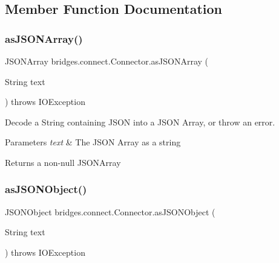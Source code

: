 \subsection{Member Function Documentation}
\mbox{\label{classbridges_1_1connect_1_1_connector_aa5bd647713545fa24c6d730eacb6bc54}} 
\subsubsection{\texorpdfstring{as\+J\+S\+O\+N\+Array()}{asJSONArray()}}
{\footnotesize\ttfamily J\+S\+O\+N\+Array bridges.\+connect.\+Connector.\+as\+J\+S\+O\+N\+Array (\begin{DoxyParamCaption}\item[{String}]{text }\end{DoxyParamCaption}) throws I\+O\+Exception}

Decode a String containing J\+S\+ON into a J\+S\+ON Array, or throw an error. 
\begin{DoxyParams}{Parameters}
{\em text} & The J\+S\+ON Array as a string \\
\hline
\end{DoxyParams}
\begin{DoxyReturn}{Returns}
a non-\/null J\+S\+O\+N\+Array 
\end{DoxyReturn}
\mbox{\label{classbridges_1_1connect_1_1_connector_aac3fb75dd7975c4439cfd1bf6cefe0a6}} 
\subsubsection{\texorpdfstring{as\+J\+S\+O\+N\+Object()}{asJSONObject()}}
{\footnotesize\ttfamily J\+S\+O\+N\+Object bridges.\+connect.\+Connector.\+as\+J\+S\+O\+N\+Object (\begin{DoxyParamCaption}\item[{String}]{text }\end{DoxyParamCaption}) throws I\+O\+Exception}


